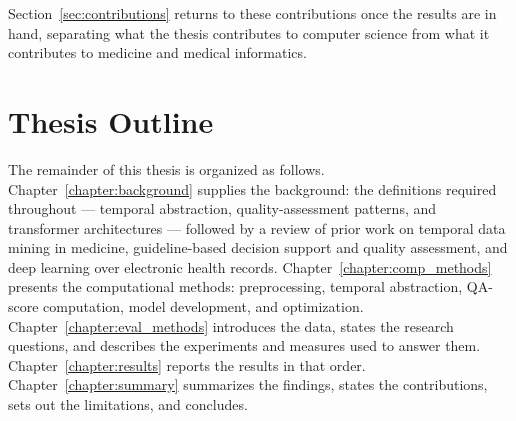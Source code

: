 Section~\ref{sec:contributions} returns to these contributions once the
results are in hand, separating what the thesis contributes to computer
science from what it contributes to medicine and medical informatics.

\section{Thesis Outline}

The remainder of this thesis is organized as follows.
Chapter~\ref{chapter:background} supplies the background: the definitions
required throughout --- temporal abstraction, quality-assessment patterns, and
transformer architectures --- followed by a review of prior work on temporal
data mining in medicine, guideline-based decision support and quality
assessment, and deep learning over electronic health records.
Chapter~\ref{chapter:comp_methods} presents the computational methods:
preprocessing, temporal abstraction, QA-score computation, model development,
and optimization. Chapter~\ref{chapter:eval_methods} introduces the data, states
the research questions, and describes the experiments and measures used to
answer them. Chapter~\ref{chapter:results} reports the results in that order.
Chapter~\ref{chapter:summary} summarizes the findings, states the
contributions, sets out the limitations, and concludes.
